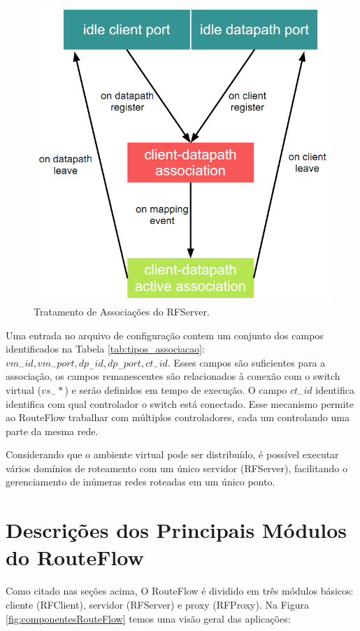 \begin{figure}[h]
\centering
\includegraphics[width=120mm]{rfserverAssociacao.png}
\caption{Tratamento de Associações do RFServer.}
\label{fig:rfserverAssociacao} 
\end{figure}


Uma entrada no arquivo de configuração contem um conjunto 
dos campos identificados na Tabela \ref{tab:tipos_associacao}:
\textit{$vm_-id, vm_-port, dp_-id, dp_-port, ct_-id$}. Esses campos
são suficientes para a associação, os campos remanescentes
são relacionados à conexão com o switch virtual ($vs_-*$) e serão
definidos em tempo de execução. O campo \textit{$ct_-id$} identifica
identifica com qual controlador o switch está conectado. Esse
mecanismo permite ao RouteFlow trabalhar com múltiplos
controladores, cada um controlando uma parte da mesma rede.

Considerando que o ambiente virtual pode ser distribuído, é 
possível executar vários domínios de roteamento com um
único servidor (RFServer), facilitando o gerenciamento de inúmeras 
redes roteadas em um único ponto.

\section{Descrições dos Principais Módulos do RouteFlow}
Como citado nas seções acima, O RouteFlow é dividido em 
três módulos básicos: cliente (RFClient), servidor (RFServer)
 e proxy (RFProxy). Na Figura
\ref{fig:componentesRouteFlow} temos uma visão geral das
aplicações:


